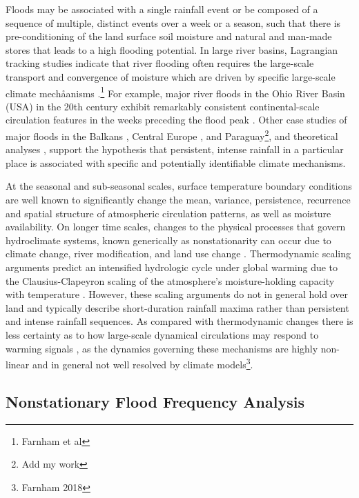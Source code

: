 \documentclass[12pt]{article}
\begin{document}
Floods may be associated with a single rainfall event or be composed of a sequence of multiple, distinct events over a week or a season, such that there is pre-conditioning of the land surface soil moisture and natural and man-made stores that leads to a high flooding potential.
In large river basins, Lagrangian tracking studies \citep{Gimeno2010} indicate that river flooding often requires the large-scale transport and convergence of moisture  which are driven by specific large-scale climate mechåanisms \citep{Dacre2014,Gimeno2014,Lu2013,Dirmeyer2010}.\footnote{Farnham et al}
For example, major river floods in the Ohio River Basin (USA) in the 20th century exhibit remarkably consistent continental-scale circulation features in the weeks preceding the flood peak \citep{Nakamura2012,Robertson2015}.
Other case studies of  major floods in the Balkans \citep{Stadtherr2016}, Central Europe \citep{Grams2014}, and Paraguay\footnote{Add my work}, and theoretical analyses \citep{Hoskins2015,Screen2014,Coumou2014}, support the hypothesis that persistent, intense rainfall in a particular place is associated with specific and potentially identifiable climate mechanisms.

At the seasonal and sub-seasonal scales, surface temperature boundary conditions are well known to significantly change the mean, variance, persistence, recurrence and spatial structure of atmospheric circulation patterns, as well as moisture availability.
On longer time scales, changes to the physical processes that govern hydroclimate systems, known generically as nonstationarity \citep{Milly2008} can occur due to climate change, river modification, and land use change \citep{Merz2014}.
Thermodynamic scaling arguments predict an intensified hydrologic cycle under global warming due to the Clausius-Clapeyron scaling of the atmosphere's moisture-holding capacity with temperature \citep[see][]{Muller2011,OGorman2015}.
However, these scaling arguments do not in general hold over land \citep{Byrne2015} and typically describe short-duration rainfall maxima rather than persistent and intense rainfall sequences.
As compared with thermodynamic changes there is less certainty as to how large-scale dynamical circulations may respond to warming signals \citep{Shaw2016,Barnes2015}, as the dynamics governing these mechanisms are highly non-linear \citep{Palmer2013} and in general not well resolved by climate models\footnote{Farnham 2018}.

\subsection{Nonstationary Flood Frequency Analysis\label{sec:ffa}}
\end{document}
